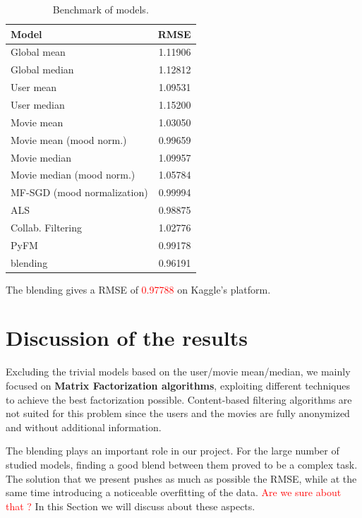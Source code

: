 \documentclass[10pt,conference,compsocconf]{IEEEtran}
\begin{document}
\begin{table}[htbp]
\centering
\begin{tabular}[c]{| l r |}
\hline
Model & RMSE \\
\hline 
\hline
Global mean			& 1.11906 \\
Global median			& 1.12812 \\
User mean			& 1.09531 \\
User median			& 1.15200 \\
Movie mean			& 1.03050 \\
Movie mean (mood norm.)		& 0.99659 \\
Movie median			& 1.09957 \\
Movie median (mood norm.)	& 1.05784 \\
MF-SGD (mood normalization)	& 0.99994 \\
ALS				& 0.98875 \\
Collab. Filtering		& 1.02776 \\
PyFM				& 0.99178 \\ \hline\hline
blending			& 0.96191 \\ 
\hline
\end{tabular}
  \caption{Benchmark of models.}
  \label{benchmark}
\end{table}

The blending gives a RMSE of \textcolor{red}{0.97788} on Kaggle's platform. 

\section{Discussion of the results}

Excluding the trivial models based on the user/movie mean/median, we mainly focused on \textbf{Matrix
Factorization algorithms}, exploiting different techniques to achieve the best factorization
possible. Content-based filtering algorithms are not suited for this problem since the users and the
movies are fully anonymized and without additional information.

The blending plays an important role in our project. For the large number of studied models,
finding a good blend between them proved to be a complex task. The solution that we present pushes
as much as possible the RMSE, while at the same time introducing a noticeable overfitting of the
data. \textcolor{red}{Are we sure about that ?}
In this Section we will discuss about these aspects.

\end{document}
